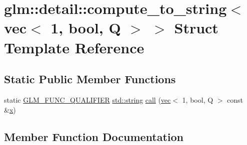 \hypertarget{structglm_1_1detail_1_1compute__to__string_3_01vec_3_011_00_01bool_00_01_q_01_4_01_4}{}\section{glm\+:\+:detail\+:\+:compute\+\_\+to\+\_\+string$<$ vec$<$ 1, bool, Q $>$ $>$ Struct Template Reference}
\label{structglm_1_1detail_1_1compute__to__string_3_01vec_3_011_00_01bool_00_01_q_01_4_01_4}
\subsection*{Static Public Member Functions}
\begin{DoxyCompactItemize}
\item 
static \mbox{\hyperlink{setup_8hpp_a33fdea6f91c5f834105f7415e2a64407}{G\+L\+M\+\_\+\+F\+U\+N\+C\+\_\+\+Q\+U\+A\+L\+I\+F\+I\+ER}} \mbox{\hyperlink{_s_d_l__opengl__glext_8h_ae84541b4f3d8e1ea24ec0f466a8c568b}{std\+::string}} \mbox{\hyperlink{structglm_1_1detail_1_1compute__to__string_3_01vec_3_011_00_01bool_00_01_q_01_4_01_4_ad6119763fcff0254a57ae8a51a9f5915}{call}} (\mbox{\hyperlink{structglm_1_1vec}{vec}}$<$ 1, bool, Q $>$ const \&\mbox{\hyperlink{_s_d_l__opengl_8h_ad0e63d0edcdbd3d79554076bf309fd47}{x}})
\end{DoxyCompactItemize}


\subsection{Member Function Documentation}
\mbox{\label{structglm_1_1detail_1_1compute__to__string_3_01vec_3_011_00_01bool_00_01_q_01_4_01_4_ad6119763fcff0254a57ae8a51a9f5915}} 
